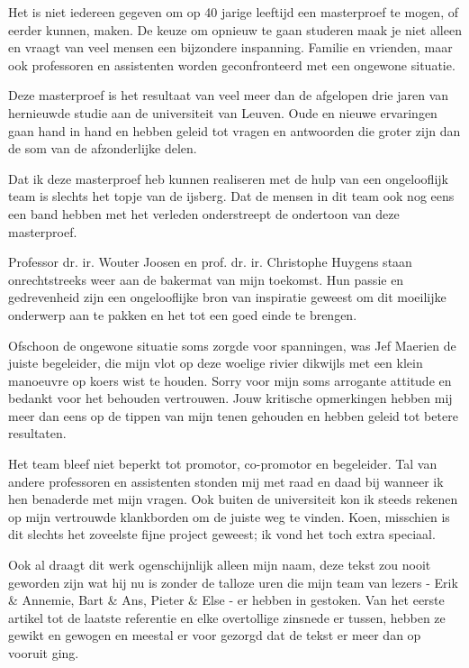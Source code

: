 
\begin{preface}

Het is niet iedereen gegeven om op 40 jarige leeftijd een masterproef te mogen,
of eerder kunnen, maken. De keuze om opnieuw te gaan studeren maak je niet
alleen en vraagt van veel mensen een bijzondere inspanning. Familie en
vrienden, maar ook professoren en assistenten worden geconfronteerd met een
ongewone situatie.

Deze masterproef is het resultaat van veel meer dan de afgelopen drie jaren van
hernieuwde studie aan de universiteit van Leuven. Oude en nieuwe ervaringen
gaan hand in hand en hebben geleid tot vragen en antwoorden die groter zijn dan
de som van de afzonderlijke delen.

Dat ik deze masterproef heb kunnen realiseren met de hulp van een ongelooflijk
team is slechts het topje van de ijsberg. Dat de mensen in dit team ook nog
eens een band hebben met het verleden onderstreept de ondertoon van deze
masterproef.

Professor dr. ir. Wouter Joosen en prof. dr. ir. Christophe Huygens staan
onrechtstreeks weer aan de bakermat van mijn toekomst. Hun passie en
gedrevenheid zijn een ongelooflijke bron van inspiratie geweest om dit
moeilijke onderwerp aan te pakken en het tot een goed einde te brengen.

Ofschoon de ongewone situatie soms zorgde voor spanningen, was Jef Maerien de
juiste begeleider, die mijn vlot op deze woelige rivier dikwijls met een klein
manoeuvre op koers wist te houden. Sorry voor mijn soms arrogante attitude en
bedankt voor het behouden vertrouwen. Jouw kritische opmerkingen hebben mij
meer dan eens op de tippen van mijn tenen gehouden en hebben geleid tot betere
resultaten.

Het team bleef niet beperkt tot promotor, co-promotor en begeleider. Tal van
andere professoren en assistenten stonden mij met raad en daad bij wanneer ik
hen benaderde met mijn vragen. Ook buiten de universiteit kon ik steeds rekenen
op mijn vertrouwde klankborden om de juiste weg te vinden. Koen, misschien is
dit slechts het zoveelste fijne project geweest; ik vond het toch extra
speciaal.

Ook al draagt dit werk ogenschijnlijk alleen mijn naam, deze tekst zou nooit
geworden zijn wat hij nu is zonder de talloze uren die mijn team van lezers -
Erik \& Annemie, Bart \& Ans, Pieter \& Else - er hebben in gestoken. Van het
eerste artikel tot de laatste referentie en elke overtollige zinsnede er
tussen, hebben ze gewikt en gewogen en meestal er voor gezorgd dat de tekst er
meer dan op vooruit ging.


\end{preface}
